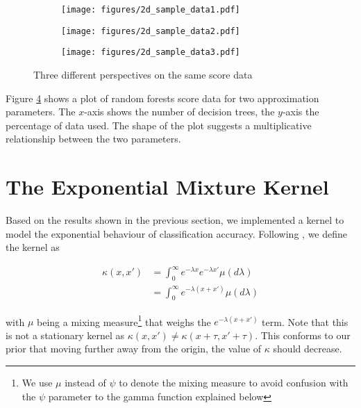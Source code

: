 \documentclass[a4paper,12pt,twoside,openright]{report}
\begin{document}
\begin{figure}
\centering
\begin{subfigure}{.33\textwidth}
  \centering
  \texttt{[image: figures/2d\_sample\_data1.pdf]}
  \caption{}
  \label{2d_1}
\end{subfigure}%
\begin{subfigure}{.33\textwidth}
  \centering
  \texttt{[image: figures/2d\_sample\_data2.pdf]}
  \caption{}
  \label{2d_2}
\end{subfigure}
\begin{subfigure}{.33\textwidth}
  \centering
  \texttt{[image: figures/2d\_sample\_data3.pdf]}
  \caption{}
  \label{2d_3}
\end{subfigure}
\caption{Three different perspectives on the same score data}
\label{2d}
\end{figure}


Figure \ref{2d} shows a plot of random forests score data for two approximation parameters. The $x$-axis shows the number of decision trees, the $y$-axis the percentage of data used. The shape of the plot suggests a multiplicative relationship between the two parameters.


\section{The Exponential Mixture Kernel}

Based on the results shown in the previous section, we implemented a kernel to model the exponential behaviour of classification accuracy. Following \cite{2014arXiv1406.3896S}, we define the kernel as

\begin{align}
\kappa(x,x') &= \int_{0}^{\infty} e^{-\lambda x}e^{-\lambda x'}\mu(d\lambda)\\
&= \int_{0}^{\infty} e^{-\lambda(x+x')}\mu(d\lambda)
\end{align}



with $\mu$ being a mixing measure\footnote{We use $\mu$ instead of $\psi$ to denote the mixing measure to avoid confusion with the $\psi$ parameter to the gamma function explained below} that weighs the $e^{-\lambda(x+x')}$ term. Note that this is not a stationary kernel as $\kappa(x, x') \neq \kappa(x + \tau, x' + \tau)$. This conforms to our prior that moving further away from the origin, the value of $\kappa$ should decrease.
\end{document}
